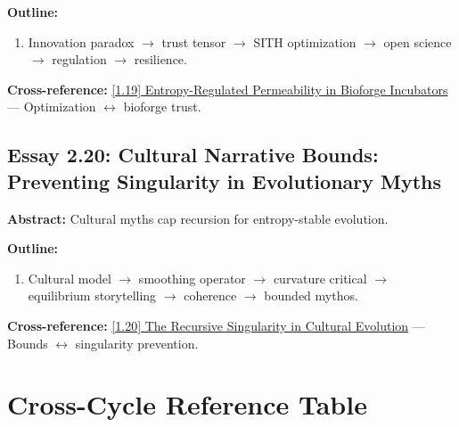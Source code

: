 \documentclass[12pt,a4paper]{article}
\begin{document}
\textbf{Outline:}
\begin{enumerate}
\item Innovation paradox $\to$ trust tensor $\to$ SITH optimization $\to$ open science $\to$ regulation $\to$ resilience.
\end{enumerate}

\textbf{Cross-reference:} \hyperref[sec:essay1-19]{[1.19] Entropy-Regulated Permeability in Bioforge Incubators} --- Optimization $\leftrightarrow$ bioforge trust.

\subsection{Essay 2.20: Cultural Narrative Bounds: Preventing Singularity in Evolutionary Myths}
\label{sec:essay2-20}

\textbf{Abstract:} Cultural myths cap recursion for entropy-stable evolution.

\textbf{Outline:}
\begin{enumerate}
\item Cultural model $\to$ smoothing operator $\to$ curvature critical $\to$ equilibrium storytelling $\to$ coherence $\to$ bounded mythos.
\end{enumerate}

\textbf{Cross-reference:} \hyperref[sec:essay1-20]{[1.20] The Recursive Singularity in Cultural Evolution} --- Bounds $\leftrightarrow$ singularity prevention.

\section{Cross-Cycle Reference Table}
\label{sec:crossref}
\end{document}

